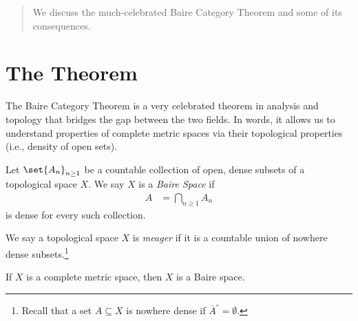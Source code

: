 \documentclass[10pt]{mypackage}
\begin{document}
\RaggedRight
\begin{abstract}
  \noindent We discuss the much-celebrated Baire Category Theorem and some of its consequences.
\end{abstract}
\section{The Theorem}%
The Baire Category Theorem is a very celebrated theorem in analysis and topology that bridges the gap between the two fields. In words, it allows us to understand properties of complete metric spaces via their topological properties (i.e., density of open sets).
\begin{definition}
Let $\set{A_n}_{n\geq 1}$ be a countable collection of open, dense subsets of a topological space $X$. We say $X$ is a \textit{Baire Space} if
\begin{align*}
A &= \bigcap_{n\geq 1}A_n
\end{align*}
is dense for every such collection.
\end{definition}
\begin{definition}
We say a topological space $X$ is \textit{meager} if it is a countable union of nowhere dense subsets.\footnote{Recall that a set $A\subseteq X$ is nowhere dense if $\overline{A}^{\circ} = \emptyset$.}
\end{definition}
\begin{theorem}
  If $X$ is a complete metric space, then $X$ is a Baire space.
\end{theorem}
\end{document}
